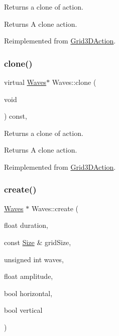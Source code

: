 Returns a clone of action.

\begin{DoxyReturn}{Returns}
A clone action. 
\end{DoxyReturn}


Reimplemented from \hyperlink{classGrid3DAction_a01d5b2d60654ef66d6551ac2190ed14c}{Grid3\+D\+Action}.

\mbox{\label{classWaves_a9da6486c1749a9e6cb8966a45897a077}} 
\subsubsection{\texorpdfstring{clone()}{clone()}\hspace{0.1cm}{\footnotesize\ttfamily [2/2]}}
{\footnotesize\ttfamily virtual \hyperlink{classWaves}{Waves}$\ast$ Waves\+::clone (\begin{DoxyParamCaption}\item[{void}]{ }\end{DoxyParamCaption}) const\hspace{0.3cm}{\ttfamily [override]}, {\ttfamily [virtual]}}

Returns a clone of action.

\begin{DoxyReturn}{Returns}
A clone action. 
\end{DoxyReturn}


Reimplemented from \hyperlink{classGrid3DAction_a01d5b2d60654ef66d6551ac2190ed14c}{Grid3\+D\+Action}.

\mbox{\label{classWaves_ab4b1b0ab15c6f81c3c251bf4f36a7fe0}} 
\subsubsection{\texorpdfstring{create()}{create()}\hspace{0.1cm}{\footnotesize\ttfamily [1/2]}}
{\footnotesize\ttfamily \hyperlink{classWaves}{Waves} $\ast$ Waves\+::create (\begin{DoxyParamCaption}\item[{float}]{duration,  }\item[{const \hyperlink{classSize}{Size} \&}]{grid\+Size,  }\item[{unsigned int}]{waves,  }\item[{float}]{amplitude,  }\item[{bool}]{horizontal,  }\item[{bool}]{vertical }\end{DoxyParamCaption})\hspace{0.3cm}{\ttfamily [static]}}



